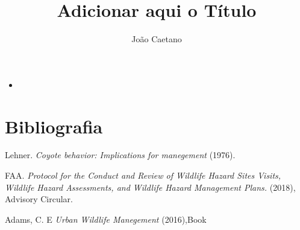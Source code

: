 \documentclass[a4paper,16,onecolumn]{article}
\author{João Caetano}
\title{Adicionar aqui o Título}
\begin{document}
\maketitle
\tableofcontents
\pagebreak
\section{}
\subsection{}

\begin{itemize}
\item 
\end{itemize}

\cite{Adams2016}

\section{Bibliografia}
\begin{thebibliography}{10}

 Lehner.
\textit{Coyote behavior: Implications for manegement}
(1976).

FAA.
\textit{Protocol for the Conduct and Review of Wildlife Hazard Sites Visits, Wildlife Hazard Assessments, and Wildlife Hazard Management Plans.} 
(2018), Advisory Circular.

Adams, C. E
\textit{Urban Wildlife Manegement}
(2016),Book

\end{thebibliography}
\end{document}
